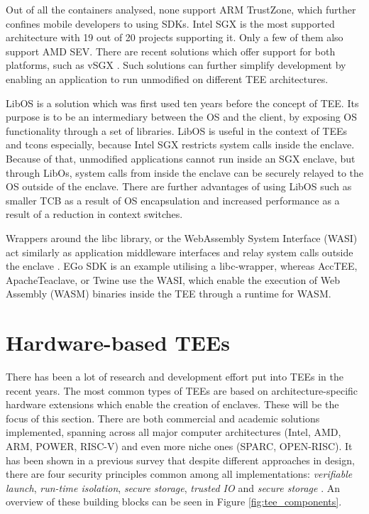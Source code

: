 \documentclass[runningheads,a4paper]{uwsese}
\begin{document}
Out of all the containers analysed, none support ARM TrustZone, which further
confines mobile developers to using SDKs. Intel SGX is the most supported
architecture with 19 out of 20 projects supporting it. Only a few of them also
support AMD SEV. There are recent solutions which offer support for both
platforms, such as vSGX \cite{vsgx}. Such solutions can further simplify
development by enabling an application to run unmodified on different TEE
architectures.

LibOS \cite{libos} is a solution which was first used ten years before the
concept of TEE. Its purpose is to be an intermediary between the OS and the
client, by exposing OS functionality through a set of libraries. LibOS is
useful in the context of TEEs and tcons especially, because Intel SGX restricts
system calls inside the enclave. Because of that, unmodified applications
cannot run inside an SGX enclave, but through LibOs, system calls from inside
the enclave can be securely relayed to the OS outside of the enclave. There are
further advantages of using LibOS such as smaller TCB as a result of OS
encapsulation and increased performance as a result of a reduction in context
switches.

Wrappers around the libc library, or the WebAssembly System Interface (WASI)
act similarly as application middleware interfaces and relay system calls
outside the enclave \cite{understanding}. EGo SDK is an example utilising a
libc-wrapper, whereas AccTEE, ApacheTeaclave, or Twine use the WASI, which
enable the execution of Web Assembly (WASM) binaries inside the TEE through a
runtime for WASM.

\section{Hardware-based TEEs}

There has been a lot of research and development effort put into TEEs in the
recent years. The most common types of TEEs are based on architecture-specific
hardware extensions which enable the creation of enclaves. These will be the
focus of this section. There are both commercial and academic solutions
implemented, spanning across all major computer architectures (Intel, AMD, ARM,
POWER, RISC-V) and even more niche ones (SPARC, OPEN-RISC). It has been shown
in a previous survey that despite different approaches in design, there are
four security principles common among all implementations: \emph{verifiable
launch}, \emph{run-time isolation}, \emph{secure storage}, \emph{trusted IO}
and \emph{secure storage} \cite{tee_hw_sup}. An overview of these building
blocks can be seen in Figure \ref{fig:tee_components}.
\end{document}
